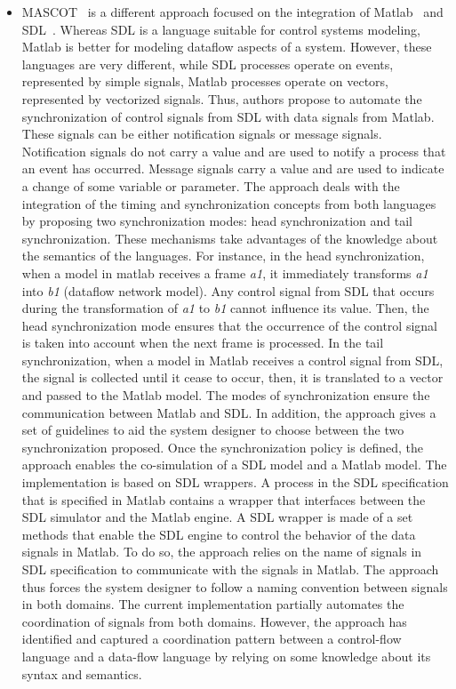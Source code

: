 \begin{itemize}
         	
         	\item MASCOT~\cite{mascotbib} is a different approach focused on the integration of Matlab~\cite{matlabbib} and SDL~\cite{sdlbib}. Whereas SDL is a language suitable for control systems modeling, Matlab is better for modeling dataflow aspects of a system. However, these languages are very different, while SDL processes operate on events, represented by simple signals, Matlab processes operate on vectors, represented by vectorized signals. Thus, authors propose to automate the synchronization of control signals from SDL with data signals from Matlab. These signals can be either notification signals or message signals. Notification signals do not carry a value and are used to notify a process that an event has occurred. Message signals carry a value and are used to indicate a change of some variable or parameter. The approach deals with the integration of the timing and synchronization concepts from both languages by proposing two synchronization modes: head synchronization and tail synchronization. These mechanisms take advantages of the knowledge about the semantics of the languages. For instance, in the head synchronization, when a model in matlab receives a frame \emph{a1}, it immediately transforms \emph{a1} into \emph{b1} (dataflow network model). Any control signal from SDL that occurs during the transformation of \emph{a1} to \emph{b1} cannot influence its value. Then, the head synchronization mode ensures that the occurrence of the control signal is taken into account when the next frame is processed. In the tail synchronization, when a model in Matlab receives a control signal from SDL, the signal is collected until it cease to occur, then, it is translated to a vector and passed to the Matlab model. The modes of synchronization ensure the communication between Matlab and SDL. In addition, the approach gives a set of guidelines to aid the system designer to choose between the two synchronization proposed. Once the synchronization policy is defined, the approach enables the co-simulation of a SDL model and a Matlab model. The implementation is based on SDL wrappers. A process in the SDL specification that is specified in Matlab contains a wrapper that interfaces between the SDL simulator and the Matlab engine. A SDL wrapper is made of a set methods that enable the SDL engine to control the behavior of the data signals in Matlab. To do so, the approach relies on the name of signals in SDL specification to communicate with the signals in Matlab. The approach thus forces the system designer to follow a naming convention between signals in both domains. The current implementation partially automates the coordination of signals from both domains. However, the approach has identified and captured a coordination pattern between a control-flow language and a data-flow language by relying on some knowledge about its syntax and semantics.
         	

\end{itemize}

